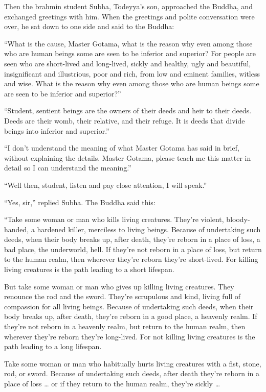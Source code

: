 \documentclass[12pt,openany]{book}%
\begin{document}
Then the brahmin student Subha, Todeyya’s son, approached the Buddha, and exchanged greetings with him. When the greetings and polite conversation were over, he sat down to one side and said to the Buddha: 

“What is the cause, Master Gotama, what is the reason why even among those who are human beings some are seen to be inferior and superior? For people are seen who are short-lived and long-lived, sickly and healthy, ugly and beautiful, insignificant and illustrious, poor and rich, from low and eminent families, witless and wise. What is the reason why even among those who are human beings some are seen to be inferior and superior?” 

“Student, sentient beings are the owners of their deeds and heir to their deeds. Deeds are their womb, their relative, and their refuge. It is deeds that divide beings into inferior and superior.” 

“I don’t understand the meaning of what Master Gotama has said in brief, without explaining the details. Master Gotama, please teach me this matter in detail so I can understand the meaning.” 

“Well then, student, listen and pay close attention, I will speak.” 

“Yes, sir,” replied Subha. The Buddha said this: 

“Take some woman or man who kills living creatures. They’re violent, bloody-handed, a hardened killer, merciless to living beings. Because of undertaking such deeds, when their body breaks up, after death, they’re reborn in a place of loss, a bad place, the underworld, hell. If they’re not reborn in a place of loss, but return to the human realm, then wherever they’re reborn they’re short-lived. For killing living creatures is the path leading to a short lifespan. 

But take some woman or man who gives up killing living creatures. They renounce the rod and the sword. They’re scrupulous and kind, living full of compassion for all living beings. Because of undertaking such deeds, when their body breaks up, after death, they’re reborn in a good place, a heavenly realm. If they’re not reborn in a heavenly realm, but return to the human realm, then wherever they’re reborn they’re long-lived. For not killing living creatures is the path leading to a long lifespan. 

Take some woman or man who habitually hurts living creatures with a fist, stone, rod, or sword. Because of undertaking such deeds, after death they’re reborn in a place of loss … or if they return to the human realm, they’re sickly … 
\end{document}

